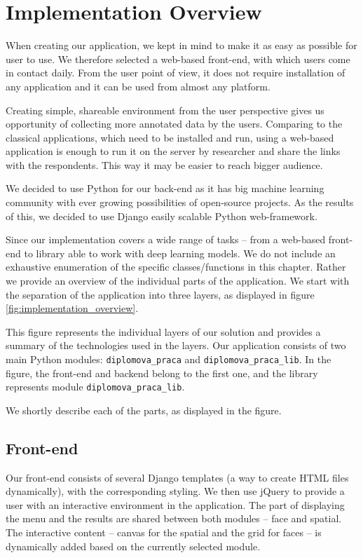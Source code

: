 \chapter{Implementation Overview}
\label{ch:developers_guide}
\label{ch:programmers_guide}

When creating our application, we kept in mind to make it as easy as possible for user to use. We therefore selected a web-based front-end, with which users come in contact daily. From the user point of view, it does not require installation of any application and it can be used from almost any platform.

Creating simple, shareable environment from the user perspective gives us opportunity of collecting more annotated data by the users. Comparing to the classical applications, which need to be installed and run, using a web-based application is enough to run it on the server by researcher and share the links with the respondents. This way it may be easier to reach bigger audience.

We decided to use Python for our back-end as it has big machine learning community with ever growing possibilities of open-source projects. As the results of this, we decided to use Django easily scalable Python web-framework.

Since our implementation covers a wide range of tasks -- from a web-based front-end to library able to work with deep learning models. We do not include an exhaustive enumeration of the specific classes/functions in this chapter. Rather we provide an overview of the individual parts of the application. We start with the separation of the application into three layers, as displayed in figure \ref{fig:implementation_overview}.

This figure represents the individual layers of our solution and provides a summary of the technologies used in the layers. Our application consists of two main Python modules: \verb+diplomova_praca+ and \verb+diplomova_praca_lib+. In the figure, the front-end and backend belong to the first one, and the library represents module \verb+diplomova_praca_lib+.

We shortly describe each of the parts, as displayed in the figure.

\section{Front-end}

Our front-end consists of several Django templates (a way to create HTML files dynamically), with the corresponding styling. We then use jQuery to provide a user with an interactive environment in the application.  The part of displaying the menu and the results are shared between both modules -- face and spatial. The interactive content -- canvas for the spatial and the grid for faces -- is dynamically added based on the currently selected module.

